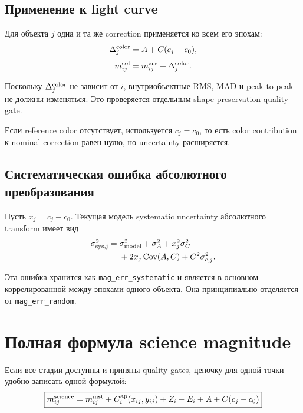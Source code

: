 \subsection{Применение к light curve}

Для объекта $j$ одна и та же correction применяется ко всем его эпохам:
\begin{equation}
  \Delta^{\rm color}_j=A+C(c_j-c_0),
\end{equation}
\begin{equation}
  m^{\rm col}_{ij}=m^{\rm ens}_{ij}+\Delta^{\rm color}_j.
  \label{eq:color-apply}
\end{equation}

Поскольку $\Delta^{\rm color}_j$ не зависит от $i$, внутриобъектные RMS, MAD и peak-to-peak не должны изменяться. Это проверяется отдельным shape-preservation quality gate.

Если reference color отсутствует, используется $c_j=c_0$, то есть color contribution к nominal correction равен нулю, но uncertainty расширяется.

\subsection{Систематическая ошибка абсолютного преобразования}

Пусть $x_j=c_j-c_0$. Текущая модель systematic uncertainty абсолютного transform имеет вид
\begin{equation}
\begin{split}
  \sigma^2_{\rm sys,j}={}&
  \sigma^2_{\rm model}
  +\sigma_A^2
  +x_j^2\sigma_C^2\\
  &+2x_j\operatorname{Cov}(A,C)
  +C^2\sigma_{c,j}^2.
\end{split}
\label{eq:color-systematic}
\end{equation}

Эта ошибка хранится как \texttt{mag\_err\_systematic} и является в основном коррелированной между эпохами одного объекта. Она принципиально отделяется от \texttt{mag\_err\_random}.

\section{Полная формула science magnitude}
\label{sec:science-composite-formula}

Если все стадии доступны и приняты quality gates, цепочку для одной точки удобно записать одной формулой:
\begin{equation}
\boxed{
  m^{\rm science}_{ij}
  =m^{\rm inst}_{ij}
  +C^{\rm ap}_i(x_{ij},y_{ij})
  +Z_i
  -E_i
  +A
  +C(c_j-c_0)
  }
  \label{eq:science-full}
\end{equation}

